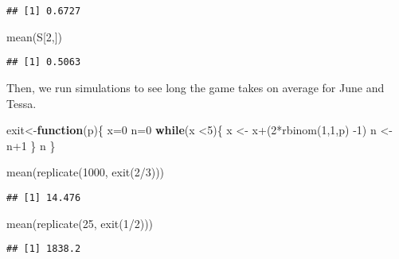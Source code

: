 \documentclass[
]{article}
\newenvironment{Shaded}{\begin{snugshade}}{\end{snugshade}}
\newcommand{\ControlFlowTok}[1]{\textcolor[rgb]{0.13,0.29,0.53}{\textbf{#1}}}
\newcommand{\DecValTok}[1]{\textcolor[rgb]{0.00,0.00,0.81}{#1}}
\newcommand{\FunctionTok}[1]{\textcolor[rgb]{0.00,0.00,0.00}{#1}}
\newcommand{\NormalTok}[1]{#1}
\newcommand{\OtherTok}[1]{\textcolor[rgb]{0.56,0.35,0.01}{#1}}
\newcommand{\SpecialCharTok}[1]{\textcolor[rgb]{0.00,0.00,0.00}{#1}}
\theoremstyle{definition}
\theoremstyle{definition}
\theoremstyle{definition}
\theoremstyle{remark}
\begin{document}
\begin{verbatim}
## [1] 0.6727
\end{verbatim}

\begin{Shaded}
\begin{Highlighting}[]
\FunctionTok{mean}\NormalTok{(S[}\DecValTok{2}\NormalTok{,])}
\end{Highlighting}
\end{Shaded}

\begin{verbatim}
## [1] 0.5063
\end{verbatim}

Then, we run simulations to see long the game takes on average for June and Tessa.

\begin{Shaded}
\begin{Highlighting}[]
\NormalTok{exit}\OtherTok{\textless{}{-}}\ControlFlowTok{function}\NormalTok{(p)\{}
\NormalTok{  x}\OtherTok{=}\DecValTok{0}
\NormalTok{  n}\OtherTok{=}\DecValTok{0}
  \ControlFlowTok{while}\NormalTok{(x }\SpecialCharTok{\textless{}}\DecValTok{5}\NormalTok{)\{}
\NormalTok{    x }\OtherTok{\textless{}{-}}\NormalTok{ x}\SpecialCharTok{+}\NormalTok{(}\DecValTok{2}\SpecialCharTok{*}\FunctionTok{rbinom}\NormalTok{(}\DecValTok{1}\NormalTok{,}\DecValTok{1}\NormalTok{,p) }\SpecialCharTok{{-}}\DecValTok{1}\NormalTok{)}
\NormalTok{  n }\OtherTok{\textless{}{-}}\NormalTok{ n}\SpecialCharTok{+}\DecValTok{1}
\NormalTok{  \}}
\NormalTok{  n}
\NormalTok{\}}

\FunctionTok{mean}\NormalTok{(}\FunctionTok{replicate}\NormalTok{(}\DecValTok{1000}\NormalTok{, }\FunctionTok{exit}\NormalTok{(}\DecValTok{2}\SpecialCharTok{/}\DecValTok{3}\NormalTok{)))}
\end{Highlighting}
\end{Shaded}

\begin{verbatim}
## [1] 14.476
\end{verbatim}

\begin{Shaded}
\begin{Highlighting}[]
\FunctionTok{mean}\NormalTok{(}\FunctionTok{replicate}\NormalTok{(}\DecValTok{25}\NormalTok{, }\FunctionTok{exit}\NormalTok{(}\DecValTok{1}\SpecialCharTok{/}\DecValTok{2}\NormalTok{)))}
\end{Highlighting}
\end{Shaded}

\begin{verbatim}
## [1] 1838.2
\end{verbatim}
\end{document}
